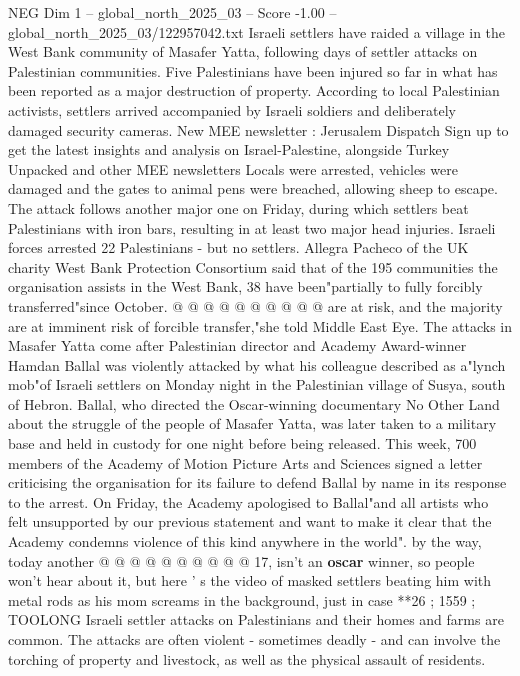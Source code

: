 \begin{textsample}{NEG Dim 1 – global\_north\_2025\_03 – Score -1.00 – global\_north\_2025\_03/122957042.txt}  \label{ex:f1_neg_028}
Israeli settlers have raided a village in the West Bank community of Masafer Yatta, following days of settler attacks on Palestinian communities.
Five Palestinians have been injured so far in what has been reported as a major destruction of property.
According to local Palestinian activists, settlers arrived accompanied by Israeli soldiers and deliberately damaged security cameras.
New MEE newsletter : Jerusalem Dispatch Sign up to get the latest insights and analysis on Israel-Palestine, alongside Turkey Unpacked and other MEE newsletters Locals were arrested, vehicles were damaged and the gates to animal pens were breached, allowing sheep to escape.
The attack follows another major one on Friday, during which settlers beat Palestinians with iron bars, resulting in at least two major head injuries.
Israeli forces arrested 22 Palestinians - but no settlers.
Allegra Pacheco of the UK charity West Bank Protection Consortium said that of the 195 communities the organisation assists in the West Bank, 38 have been"partially to fully forcibly transferred"since October. @ @ @ @ @ @ @ @ @ @ are at risk, and the majority are at imminent risk of forcible transfer,"she told Middle East Eye.
The attacks in Masafer Yatta come after Palestinian director and Academy Award-winner Hamdan Ballal was violently attacked by what his colleague described as a"lynch mob"of Israeli settlers on Monday night in the Palestinian village of Susya, south of Hebron.
Ballal, who directed the Oscar-winning documentary No Other Land about the struggle of the people of Masafer Yatta, was later taken to a military base and held in custody for one night before being released.
This week, 700 members of the Academy of Motion Picture Arts and Sciences signed a letter criticising the organisation for its failure to defend Ballal by name in its response to the arrest.
On Friday, the Academy apologised to Ballal"and all artists who felt unsupported by our previous statement and want to make it clear that the Academy condemns violence of this kind anywhere in the world". by the way, today another @ @ @ @ @ @ @ @ @ @ 17, isn't an \textbf{oscar} winner, so people won't hear about it, but here ' s the video of masked settlers beating him with metal rods as his mom screams in the background, just in case **26 ; 1559 ; TOOLONG Israeli settler attacks on Palestinians and their homes and farms are common.
The attacks are often violent - sometimes deadly - and can involve the torching of property and livestock, as well as the physical assault of residents.

\end{textsample}
